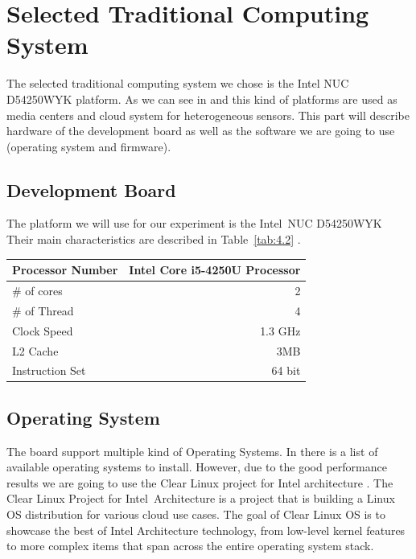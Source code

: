 \section{Selected Traditional Computing System}
\noindent

The selected traditional computing system we chose is the Intel NUC D54250WYK
platform. As we can see in \cite{Bo} and \cite{Shen} this kind of platforms are
used as media centers and cloud system for heterogeneous sensors. This part
will describe hardware of the development board as well as the software we are
going to use (operating system and firmware).

\subsection{Development Board} 

The platform we will use for our experiment is the
Intel\textregistered\ NUC D54250WYK Their main characteristics are
described in Table~\ref{tab:4.2} \cite{NUC}.

    \begin{center}
    \begin{tabular}{ | l | r |}
        \hline
        Processor Number & Intel Core i5-4250U Processor \\ \hline
        \# of cores &  2 \\ \hline
        \# of Thread & 4  \\ \hline
        Clock Speed & 1.3 GHz  \\ \hline
        L2 Cache & 3MB  \\ \hline
        Instruction Set & 64 bit  \\ \hline
    \end{tabular}
     \label{tab:4.2}
    \end{center}


\subsection{Operating System} 

The board support multiple kind of Operating Systems. In \cite{NUC-OS} there is
a list of available operating systems to install. However, due to the good
performance results \cite{phoronix-clear} we are going to use the Clear Linux
project for Intel architecture \cite{clear-linux}. The Clear Linux Project for
Intel\textregistered\ Architecture is a project that is building a Linux OS
distribution for various cloud use cases. The goal of Clear Linux OS is to
showcase the best of Intel Architecture technology, from low-level kernel
features to more complex items that span across the entire operating system
stack.


